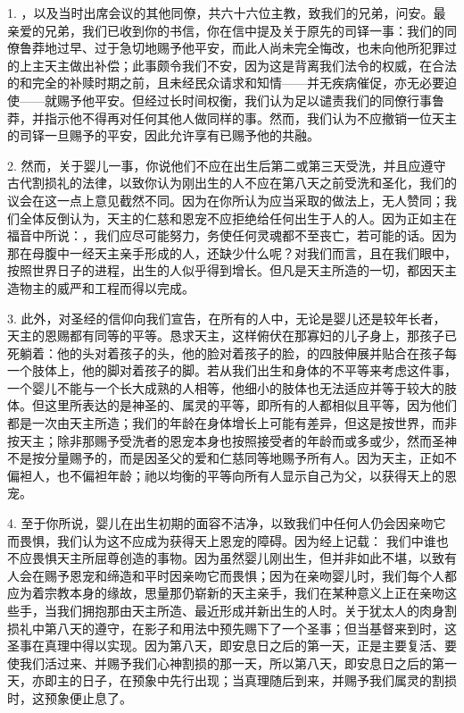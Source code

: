 1. ，以及当时出席会议的其他同僚，共六十六位主教，致我们的兄弟，问安。最亲爱的兄弟，我们已收到你的书信，你在信中提及关于原先的司铎一事：我们的同僚鲁莽地过早、过于急切地赐予他平安，而此人尚未完全悔改，也未向他所犯罪过的上主天主做出补偿；此事颇令我们不安，因为这是背离我们法令的权威，在合法的和完全的补赎时期之前，且未经民众请求和知情——并无疾病催促，亦无必要迫使——就赐予他平安。但经过长时间权衡，我们认为足以谴责我们的同僚行事鲁莽，并指示他不得再对任何其他人做同样的事。然而，我们认为不应撤销一位天主的司铎一旦赐予的平安，因此允许享有已赐予他的共融。\par

2. 然而，关于婴儿一事，你说他们不应在出生后第二或第三天受洗，并且应遵守古代割损礼的法律，以致你认为刚出生的人不应在第八天之前受洗和圣化，我们的议会在这一点上意见截然不同。因为在你所认为应当采取的做法上，无人赞同；我们全体反倒认为，天主的仁慈和恩宠不应拒绝给任何出生于人的人。因为正如主在福音中所说：，我们应尽可能努力，务使任何灵魂都不至丧亡，若可能的话。因为那在母腹中一经天主亲手形成的人，还缺少什么呢？对我们而言，且在我们眼中，按照世界日子的进程，出生的人似乎得到增长。但凡是天主所造的一切，都因天主造物主的威严和工程而得以完成。\par

3. 此外，对圣经的信仰向我们宣告，在所有的人中，无论是婴儿还是较年长者，天主的恩赐都有同等的平等。恳求天主，这样俯伏在那寡妇的儿子身上，那孩子已死躺着：他的头对着孩子的头，他的脸对着孩子的脸，的四肢伸展并贴合在孩子每一个肢体上，他的脚对着孩子的脚。若从我们出生和身体的不平等来考虑这件事，一个婴儿不能与一个长大成熟的人相等，他细小的肢体也无法适应并等于较大的肢体。但这里所表达的是神圣的、属灵的平等，即所有的人都相似且平等，因为他们都是一次由天主所造；我们的年龄在身体增长上可能有差异，但这是按世界，而非按天主；除非那赐予受洗者的恩宠本身也按照接受者的年龄而或多或少，然而圣神不是按分量赐予的，而是因圣父的爱和仁慈同等地赐予所有人。因为天主，正如不偏袒人，也不偏袒年龄；祂以均衡的平等向所有人显示自己为父，以获得天上的恩宠。\par

4. 至于你所说，婴儿在出生初期的面容不洁净，以致我们中任何人仍会因亲吻它而畏惧，我们认为这不应成为获得天上恩宠的障碍。因为经上记载： 我们中谁也不应畏惧天主所屈尊创造的事物。因为虽然婴儿刚出生，但并非如此不堪，以致有人会在赐予恩宠和缔造和平时因亲吻它而畏惧；因为在亲吻婴儿时，我们每个人都应为着宗教本身的缘故，思量那仍崭新的天主亲手，我们在某种意义上正在亲吻这些手，当我们拥抱那由天主所造、最近形成并新出生的人时。关于犹太人的肉身割损礼中第八天的遵守，在影子和用法中预先赐下了一个圣事；但当基督来到时，这圣事在真理中得以实现。因为第八天，即安息日之后的第一天，正是主要复活、要使我们活过来、并赐予我们心神割损的那一天，所以第八天，即安息日之后的第一天，亦即主的日子，在预象中先行出现；当真理随后到来，并赐予我们属灵的割损时，这预象便止息了。\par


